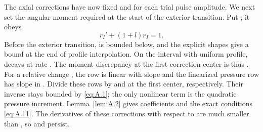 The axial corrections have now fixed  and  for
each trial pulse amplitude. We next set the angular moment required at the start of the exterior
transition. Put ; it obeys
\[
r_I'+(1+l)r_I=1.
\]
Before the exterior transition,  is bounded below, and the explicit
shapes give a  bound  at
the end of profile interpolation. On the interval with uniform profile,
%
 decays at rate . The
moment discrepancy at the first correction center is thus
. For a relative change
, the
 row is linear with slope  and the
linearized pressure row has slope  in
. Divide these rows by  and
 at the first center, respectively. Their inverse stays bounded by
\eqref{eq:A.1}; the only nonlinear term is the quadratic pressure increment. Lemma~\ref{lem:A.2}
gives coefficients  and the exact
conditions \eqref{eq:A.11}. The derivatives of these corrections with respect to
 are much smaller than , so
 and  persist.

